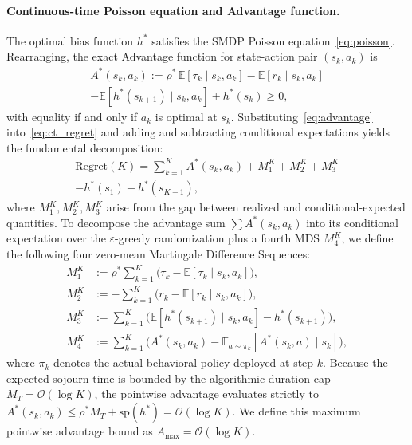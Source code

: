 \documentclass[letterpaper, 10 pt, conference]{IEEEconf}
\newcommand{\E}{\mathbb{E}}
\begin{document}
\paragraph{Continuous-time Poisson equation and Advantage function.}
The optimal bias function $h^*$ satisfies the SMDP Poisson equation~\eqref{eq:poisson}. Rearranging, the exact Advantage function for state-action pair $(s_k, a_k)$ is
\begin{multline}
    \label{eq:advantage}
    A^*(s_k, a_k) := \rho^*\,\E[\tau_k \mid s_k, a_k] - \E[r_k \mid s_k, a_k] \\
    - \E[h^*(s_{k+1}) \mid s_k, a_k] + h^*(s_k) \geq 0,
\end{multline}
with equality if and only if $a_k$ is optimal at $s_k$. Substituting~\eqref{eq:advantage} into~\eqref{eq:ct_regret} and adding and subtracting conditional expectations yields the fundamental decomposition:
\begin{multline}
    \label{eq:ct_decomp}
    \mathrm{Regret}(K) = \sum_{k=1}^K A^*(s_k, a_k) + M_1^K + M_2^K + M_3^K \\
    - h^*(s_1) + h^*(s_{K+1}),
\end{multline}
where $M_1^K, M_2^K, M_3^K$ arise from the gap between realized and conditional-expected quantities. To decompose the advantage sum $\sum A^*(s_k, a_k)$ into its conditional expectation over the $\varepsilon$-greedy randomization plus a fourth MDS $M_4^K$, we define the following four zero-mean Martingale Difference Sequences:
\begin{align}
    M_1^K &:= \rho^* \sum_{k=1}^K \big(\tau_k - \E[\tau_k \mid s_k, a_k]\big), \label{eq:M1} \\
    M_2^K &:= -\sum_{k=1}^K \big(r_k - \E[r_k \mid s_k, a_k]\big), \label{eq:M2} \\
    M_3^K &:= \sum_{k=1}^K \big(\E[h^*(s_{k+1}) \mid s_k, a_k] - h^*(s_{k+1})\big), \label{eq:M3} \\
    M_4^K &:= \sum_{k=1}^K \Big( A^*(s_k, a_k) - \E_{a \sim \pi_k}[A^*(s_k, a) \mid s_k] \Big), \label{eq:M4}
\end{align}
where $\pi_k$ denotes the actual behavioral policy deployed at step $k$. Because the expected sojourn time is bounded by the algorithmic duration cap $M_T = \mathcal{O}(\log K)$, the pointwise advantage evaluates strictly to $A^*(s_k, a_k) \le \rho^* M_T + \mathrm{sp}(h^*) = \mathcal{O}(\log K)$. We define this maximum pointwise advantage bound as $A_{\max} = \mathcal{O}(\log K)$.
\end{document}
